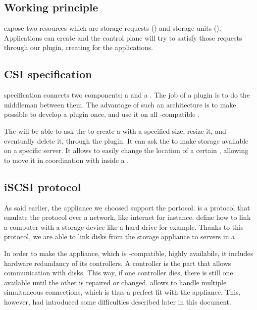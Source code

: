 \subsection{Working principle}

  expose two resources which are storage requests () and storage units (). Applications can create  and the  control plane will try to satisfy those requests through our  plugin, creating  for the applications.

\subsection{CSI specification}

 specification connects two components: a  and a . The job of a  plugin is to do the middleman between them. The advantage of such an architecture is to make possible to develop a plugin once, and use it on all -compatible .

The  will be able to ask the  to create a  with a specified size, resize it, and eventually delete it, through the  plugin. It can ask the  to make storage available on a specific server. It allows to easily change the location of a certain , allowing to move it in coordination with  inside a .

\subsection{iSCSI protocol}

As said earlier, the appliance we choosed support the  portocol.  is a protocol that emulate the  protocol over a network, like internet for instance.  define how to link a computer with a storage device like a hard drive for example. Thanks to this protocol, we are able to link disks from the storage appliance to servers in a  .

In order to make the appliance, which is -compatible, highly availabile, it includes hardware redundancy of its controllers. A controller is the part that allows communication with disks. This way, if one controller dies, there is still one available until the other is repaired or changed.  allows to handle multiple simultaneous connections, which is thus a perfect fit with the appliance. This, however, had introduced some difficulties described later in this document.

